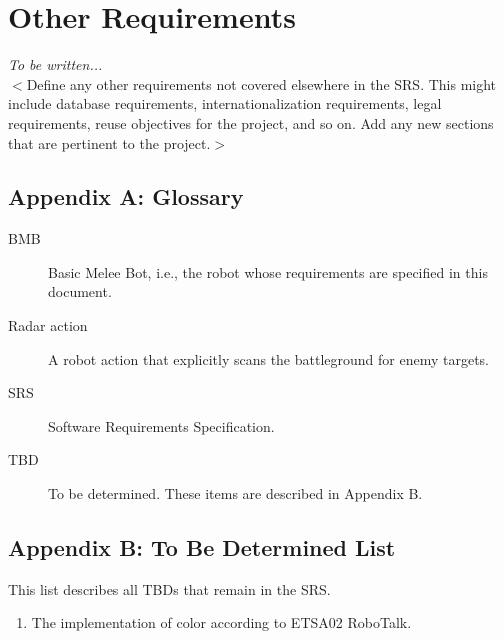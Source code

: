 \documentclass{scrreprt}
\begin{document}
\chapter{Other Requirements}
\textit{To be written...}\\
$<$Define any other requirements not covered elsewhere in the SRS. This might include database requirements, internationalization requirements, legal requirements, reuse objectives for the project, and so on. Add any new sections that are pertinent to the project.$>$

\section*{Appendix A: Glossary}

\begin{description}
\item[BMB] Basic Melee Bot, i.e., the robot whose requirements are specified in this document.
\item[Radar action] A robot action that explicitly scans the battleground for enemy targets.
\item[SRS] Software Requirements Specification.
\item[TBD] To be determined. These items are described in Appendix B.
\end{description}

\section*{Appendix B: To Be Determined List}
This list describes all TBDs that remain in the SRS.
\begin{enumerate}
\item The implementation of color according to ETSA02 RoboTalk.
\end{enumerate}
\end{document}
